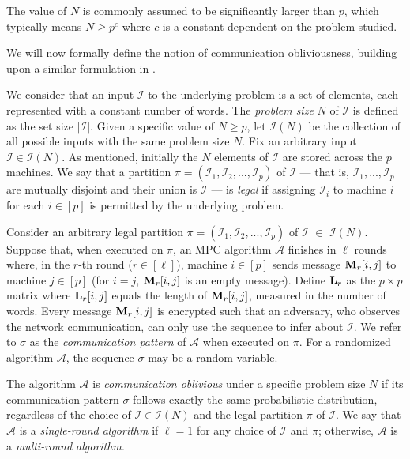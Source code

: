\documentclass[sigconf]{acmart}
\def\vgap{\vspace{0mm}}
\def\extraspacing{\vspace{1mm} \noindent}
\def\A{\mathcal{A}}
\def\I{\mathcal{I}}
\def\II{\mathscr{I}}
\begin{document}
\vgap

The value of $N$ is commonly assumed to be significantly larger than $p$, which typically means $N \ge p^c$ where $c$ is a constant dependent on the problem studied.

\extraspacing {\bf Communication-Oblivious Algorithms.} We will now formally define the notion of communication obliviousness, building upon a similar formulation in \cite{ccls20}.

\vgap

We consider that an input $\I$ to the underlying problem is a set of elements, each represented with a constant number of words. The {\em problem size} $N$ of $\I$ is defined as the set size $|\I|$. Given a specific value of $N \ge p$, let $\II(N)$ be the collection of all possible inputs with the same problem size $N$. Fix an arbitrary input $\I \in \II(N)$. As mentioned, initially the $N$ elements of $\I$ are stored across the $p$ machines. We say that a partition $\pi = (\I_1, \I_2, ..., \I_p)$ of $\I$ --- that is, $\I_1, ..., \I_p$ are mutually disjoint and their union is $\I$ --- is {\em legal} if assigning $\I_i$ to machine $i$ for each $i \in [p]$ is permitted by the underlying problem.

\vgap

Consider an arbitrary legal partition $\pi = (\I_1, \I_2, ..., \I_p)$ of $\I$ $\in$ $\II(N)$. Suppose that, when executed on $\pi$, an MPC algorithm $\A$ finishes in $\ell$ rounds where, in the $r$-th round ($r \in [\ell]$), machine $i \in [p]$ sends message $\mathbf{M}_r[i,j]$ to machine $j \in [p]$ (for $i = j$, $\mathbf{M}_r[i,j]$ is an empty message). Define $\mathbf{L}_r$ as the $p \times p$ matrix where $\mathbf{L}_r[i, j]$ equals the length of $\mathbf{M}_r[i,j]$, measured in the number of words. Every message $\mathbf{M}_r[i,j]$ is encrypted such that an adversary, who observes the network communication, can only use the sequence %
to infer about $\I$. We refer to $\sigma$ as the {\em communication pattern} of $\A$ when executed on $\pi$. For a randomized algorithm $\A$, the sequence $\sigma$ may be a random variable.

\vgap

The algorithm $\A$ is {\em communication oblivious} under a specific problem size $N$ if its communication pattern $\sigma$ follows exactly the same probabilistic distribution, regardless of the choice of $\I \in \II(N)$ and the legal partition $\pi$ of $\I$. We say that $\A$ is a {\em single-round algorithm} if $\ell = 1$ for any choice of $\I$ and $\pi$; otherwise, $\A$ is a {\em multi-round algorithm}.
\end{document}
